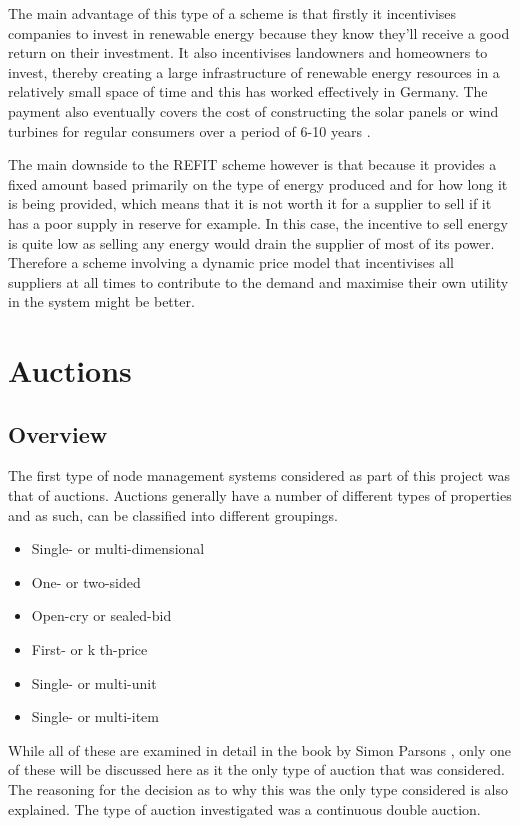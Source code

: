 \documentclass[a4paper, notitlepage]{report}
\begin{document}
The main advantage of this type of a scheme is that firstly it incentivises
companies to invest in renewable energy because they know they’ll receive a good
return on their investment. It also incentivises landowners and homeowners to
invest, thereby creating a large infrastructure of renewable energy resources in
a relatively small space of time and this has worked effectively in Germany. The
payment also eventually covers the cost of constructing the solar panels or wind
turbines for regular consumers over a period of 6-10 years \cite{lauber2004refit}. 

The main downside to the REFIT scheme however is that because it provides a
fixed amount based primarily on the type of energy produced and for how long it
is being provided, which means that it is not worth it for a supplier to sell if
it has a poor supply in reserve for example. In this case, the incentive to sell
energy is quite low as selling any energy would drain the supplier of most of
its power. Therefore a scheme involving a dynamic price model that incentivises
all suppliers at all times to contribute to the demand and maximise their own
utility in the system might be better.
\chapter{Auctions}
\label{sec:org1c14c4d}
\section{Overview}
\label{sec:org289457d}
The first type of node management systems considered as part of this project was
that of auctions. Auctions generally have a number of different types of
properties and as such, can be classified into different groupings. 

\begin{itemize}
\item Single- or multi-dimensional
\item One- or two-sided
\item Open-cry or sealed-bid
\item First- or k th-price
\item Single- or multi-unit
\item Single- or multi-item
\end{itemize}

While all of these are examined in detail in the book by Simon Parsons
\cite{parsons2011auctions}, only one of these will be discussed here as it the
only type of auction that was considered. The reasoning for the decision as to
why this was the only type considered is also explained. The type of auction
investigated was a continuous double auction. 
\end{document}
